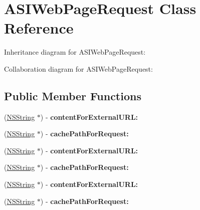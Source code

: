 \hypertarget{interface_a_s_i_web_page_request}{
\section{\-A\-S\-I\-Web\-Page\-Request \-Class \-Reference}
\label{interface_a_s_i_web_page_request}
}


\-Inheritance diagram for \-A\-S\-I\-Web\-Page\-Request\-:


\-Collaboration diagram for \-A\-S\-I\-Web\-Page\-Request\-:
\subsection*{\-Public \-Member \-Functions}
\begin{DoxyCompactItemize}
\item 
\hypertarget{interface_a_s_i_web_page_request_a390374f9e62e18bd9ad21012face9d14}{
(\hyperlink{class_n_s_string}{\-N\-S\-String} $\ast$) -\/ {\bfseries content\-For\-External\-U\-R\-L\-:}}
\label{interface_a_s_i_web_page_request_a390374f9e62e18bd9ad21012face9d14}

\item 
\hypertarget{interface_a_s_i_web_page_request_a8394b71a19dd805b86d8c42bd7d92873}{
(\hyperlink{class_n_s_string}{\-N\-S\-String} $\ast$) -\/ {\bfseries cache\-Path\-For\-Request\-:}}
\label{interface_a_s_i_web_page_request_a8394b71a19dd805b86d8c42bd7d92873}

\item 
\hypertarget{interface_a_s_i_web_page_request_a390374f9e62e18bd9ad21012face9d14}{
(\hyperlink{class_n_s_string}{\-N\-S\-String} $\ast$) -\/ {\bfseries content\-For\-External\-U\-R\-L\-:}}
\label{interface_a_s_i_web_page_request_a390374f9e62e18bd9ad21012face9d14}

\item 
\hypertarget{interface_a_s_i_web_page_request_a8394b71a19dd805b86d8c42bd7d92873}{
(\hyperlink{class_n_s_string}{\-N\-S\-String} $\ast$) -\/ {\bfseries cache\-Path\-For\-Request\-:}}
\label{interface_a_s_i_web_page_request_a8394b71a19dd805b86d8c42bd7d92873}

\item 
\hypertarget{interface_a_s_i_web_page_request_a390374f9e62e18bd9ad21012face9d14}{
(\hyperlink{class_n_s_string}{\-N\-S\-String} $\ast$) -\/ {\bfseries content\-For\-External\-U\-R\-L\-:}}
\label{interface_a_s_i_web_page_request_a390374f9e62e18bd9ad21012face9d14}

\item 
\hypertarget{interface_a_s_i_web_page_request_a8394b71a19dd805b86d8c42bd7d92873}{
(\hyperlink{class_n_s_string}{\-N\-S\-String} $\ast$) -\/ {\bfseries cache\-Path\-For\-Request\-:}}
\label{interface_a_s_i_web_page_request_a8394b71a19dd805b86d8c42bd7d92873}


\end{DoxyCompactItemize}
